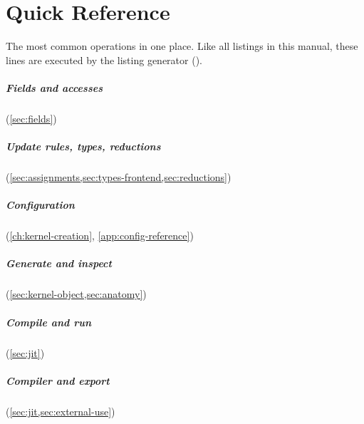 \chapter{Quick Reference}\label{app:quick-reference}

The most common operations in one place. Like all listings in this manual, these
lines are executed by the listing generator ().

\paragraph{Fields and accesses} (\cref{sec:fields})

\paragraph{Update rules, types, reductions} (\cref{sec:assignments,sec:types-frontend,sec:reductions})

\paragraph{Configuration} (\cref{ch:kernel-creation}, \cref{app:config-reference})

\paragraph{Generate and inspect} (\cref{sec:kernel-object,sec:anatomy})

\paragraph{Compile and run} (\cref{sec:jit})

\paragraph{Compiler and export} (\cref{sec:jit,sec:external-use})
